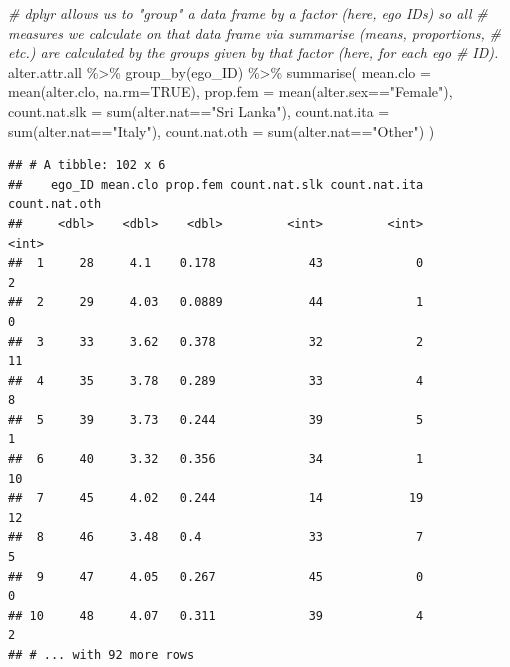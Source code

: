 \documentclass[
]{book}
\newenvironment{Shaded}{\begin{snugshade}}{\end{snugshade}}
\newcommand{\AttributeTok}[1]{\textcolor[rgb]{0.77,0.63,0.00}{#1}}
\newcommand{\CommentTok}[1]{\textcolor[rgb]{0.56,0.35,0.01}{\textit{#1}}}
\newcommand{\ConstantTok}[1]{\textcolor[rgb]{0.00,0.00,0.00}{#1}}
\newcommand{\FunctionTok}[1]{\textcolor[rgb]{0.00,0.00,0.00}{#1}}
\newcommand{\NormalTok}[1]{#1}
\newcommand{\SpecialCharTok}[1]{\textcolor[rgb]{0.00,0.00,0.00}{#1}}
\newcommand{\StringTok}[1]{\textcolor[rgb]{0.31,0.60,0.02}{#1}}
\begin{document}
\begin{Shaded}
\begin{Highlighting}[]
\CommentTok{\# dplyr allows us to "group" a data frame by a factor (here, ego IDs) so all}
\CommentTok{\# measures we calculate on that data frame via summarise (means, proportions,}
\CommentTok{\# etc.) are calculated by the groups given by that factor (here, for each ego}
\CommentTok{\# ID).}
\NormalTok{alter.attr.all }\SpecialCharTok{\%\textgreater{}\%} 
  \FunctionTok{group\_by}\NormalTok{(ego\_ID) }\SpecialCharTok{\%\textgreater{}\%} 
  \FunctionTok{summarise}\NormalTok{(}
    \AttributeTok{mean.clo =} \FunctionTok{mean}\NormalTok{(alter.clo, }\AttributeTok{na.rm=}\ConstantTok{TRUE}\NormalTok{), }
    \AttributeTok{prop.fem =} \FunctionTok{mean}\NormalTok{(alter.sex}\SpecialCharTok{==}\StringTok{"Female"}\NormalTok{), }
    \AttributeTok{count.nat.slk =} \FunctionTok{sum}\NormalTok{(alter.nat}\SpecialCharTok{==}\StringTok{"Sri Lanka"}\NormalTok{), }
    \AttributeTok{count.nat.ita =} \FunctionTok{sum}\NormalTok{(alter.nat}\SpecialCharTok{==}\StringTok{"Italy"}\NormalTok{), }
    \AttributeTok{count.nat.oth =} \FunctionTok{sum}\NormalTok{(alter.nat}\SpecialCharTok{==}\StringTok{"Other"}\NormalTok{)}
\NormalTok{  )}
\end{Highlighting}
\end{Shaded}

\begin{verbatim}
## # A tibble: 102 x 6
##    ego_ID mean.clo prop.fem count.nat.slk count.nat.ita count.nat.oth
##     <dbl>    <dbl>    <dbl>         <int>         <int>         <int>
##  1     28     4.1    0.178             43             0             2
##  2     29     4.03   0.0889            44             1             0
##  3     33     3.62   0.378             32             2            11
##  4     35     3.78   0.289             33             4             8
##  5     39     3.73   0.244             39             5             1
##  6     40     3.32   0.356             34             1            10
##  7     45     4.02   0.244             14            19            12
##  8     46     3.48   0.4               33             7             5
##  9     47     4.05   0.267             45             0             0
## 10     48     4.07   0.311             39             4             2
## # ... with 92 more rows
\end{verbatim}
\end{document}
